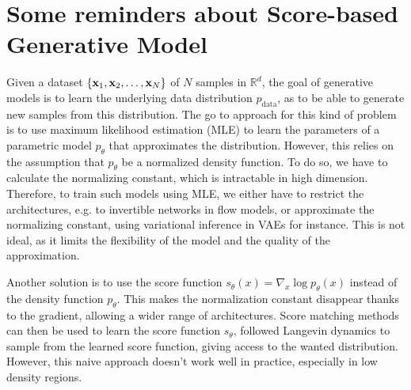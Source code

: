 \documentclass{article}
\begin{document}




\section{Some reminders about Score-based Generative Model}

Given a dataset $\left\lbrace \mathbf{x}_1, \mathbf{x}_2, \dots, \mathbf{x}_N \right\rbrace$ of $N$ samples in $\mathbb{R}^d$, the goal of generative models is to learn the underlying data distribution $p_\mathrm{data}$, as to be able to generate new samples from this distribution.
The go to approach for this kind of problem is to use maximum likelihood estimation (MLE) to learn the parameters of a parametric model $p_\theta$ that approximates the distribution. However, this relies on the assumption that $p_\theta$ be a normalized density function. To do so, we have to calculate the normalizing constant, which is intractable in high dimension. Therefore, to train such models using MLE, we either have to restrict the architectures, e.g. to invertible networks in flow models, or approximate the normalizing constant, using variational inference in VAEs for instance. This is not ideal, as it limits the flexibility of the model and the quality of the approximation.

Another solution is to use the score function $s_\theta(x) = \nabla_x \log p_\theta(x)$ instead of the density function $p_\theta$.
This makes the normalization constant disappear thanks to the gradient, allowing a wider range of architectures.
Score matching methods can then be used to learn the score function $s_\theta$, followed Langevin dynamics to sample from the learned score function, giving access to the wanted distribution.
However, this naive approach doesn't work well in practice, especially in low density regions.
\end{document}
